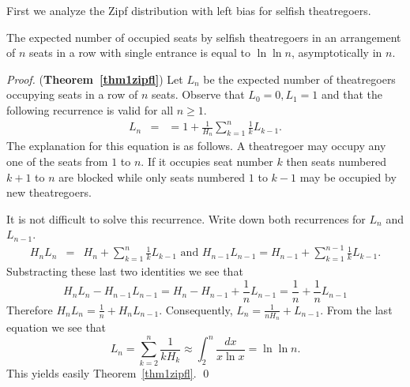 \documentclass[11pt]{llncs}
\begin{document}
First we analyze the Zipf distribution 
with left bias for selfish theatregoers. 

\begin{theorem}
\label{thm1zipfl}
The expected number of occupied seats by selfish theatregoers
in an arrangement of $n$ seats
in a row with single entrance is equal to $\ln \ln n$, asymptotically in $n$.
\end{theorem}
\begin{proof} ({\bf Theorem~\ref{thm1zipfl}})
Let $L_n$ be the expected number of theatregoers occupying seats 
in a row of $n$ seats.
Observe that $L_0=0, L_1 =1$ and that the following recurrence is valid
for all $n \geq 1$.
\begin{eqnarray}
L_n &=& \label{maineq1z}
= 1 + \frac{1}{H_n} \sum_{k=1}^{n} \frac{1}{k} L_{k-1}.
\end{eqnarray}
The explanation for this equation is as follows. A theatregoer
may occupy any one of the seats from $1$ to $n$. If it
occupies seat number $k$ then seats numbered $k+1$ to $n$
are blocked while only seats numbered $1$ to $k-1$ may be
occupied by new theatregoers. 

It is not difficult to solve this recurrence. Write down
both recurrences for $L_n$ and $L_{n-1}$.
\begin{eqnarray*}
H_n L_n 
&=& 
H_n + \sum_{k=1}^{n} \frac{1}{k} L_{k-1} 
\mbox{ and }
H_{n-1} L_{n-1} 
= H_{n-1} + \sum_{k=1}^{n-1} \frac{1}{k} L_{k-1}.
\end{eqnarray*}
Substracting these last two identities we see that
$$
H_nL_n - H_{n-1} L_{n-1} = H_n - H_{n-1} + \frac{1}{n} L_{n-1}
= \frac{1}{n} + \frac{1}{n} L_{n-1}
$$
Therefore $H_n L_n = \frac{1}{n} + H_n L_{n-1}$.
Consequently,
$
L_n = \frac{1}{nH_n} + L_{n-1}.
$
From the last equation we see that
$$
L_n = \sum_{k=2}^n \frac{1}{kH_k} \approx \int_2^n \frac{dx}{x \ln x}  = \ln \ln n .
$$
This yields easily Theorem~\ref{thm1zipfl}.
\qed
\end{proof}
\end{document}
